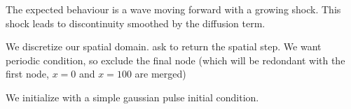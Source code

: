 \documentclass[letterpaper,10pt,english]{sphinxmanual}
\begin{document}
The expected behaviour is a wave moving forward with a growing shock.
This shock leads to discontinuity smoothed by the diffusion term.

\begin{sphinxVerbatim}[commandchars=\\\{\}]
  
               
\end{sphinxVerbatim}

We discretize our spatial domain.  ask to return the
spatial step. We want periodic condition, so  exclude
the final node (which will be redondant with the first node, \(x=0\)
and \(x=100\) are merged)

\begin{sphinxVerbatim}[commandchars=\\\{\}]
       
\end{sphinxVerbatim}

We initialize with a simple gaussian pulse initial condition.

\begin{sphinxVerbatim}[commandchars=\\\{\}]
     

   

 
 
 
\end{sphinxVerbatim}
\end{document}
